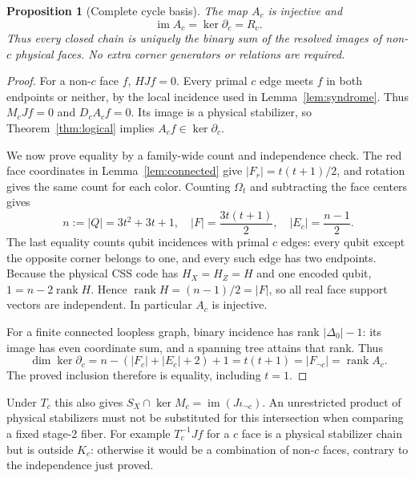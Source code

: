 \documentclass[11pt]{article}
\theoremstyle{definition}
\theoremstyle{plain}
\newtheorem{proposition}[definition]{Proposition}
\theoremstyle{remark}
\begin{document}
\begin{proposition}[Complete cycle basis]\label{prop:facebasis}
The map $A_c$ is injective and
\begin{equation}
 \operatorname{im}A_c=\ker\partial_c=R_c .
 \label{eq:facebasis}
\end{equation}
Thus every closed chain is uniquely the binary sum of the resolved
images of non-$c$ physical faces. No extra corner generators or
relations are required.
\end{proposition}
\begin{proof}
For a non-$c$ face $f$, $HJf=0$. Every primal $c$ edge meets $f$
in both endpoints or neither, by the local incidence used in
Lemma~\ref{lem:syndrome}. Thus $M_cJf=0$ and $D_cA_cf=0$.
Its image is a physical stabilizer, so Theorem~\ref{thm:logical}
implies $A_cf\in\ker\partial_c$.

We now prove equality by a family-wide count and independence check.
The red face coordinates in Lemma~\ref{lem:connected} give
$|F_r|=t(t+1)/2$, and rotation gives the same count for each color.
Counting $\Omega_t$ and subtracting the face centers gives
\[
 n:=|Q|=3t^2+3t+1,\quad
 |F|=\frac{3t(t+1)}2,\quad
 |E_c|=\frac{n-1}{2}.
\]
The last equality counts qubit incidences with primal $c$ edges:
every qubit except the opposite corner belongs to one, and every
such edge has two endpoints.
Because the physical CSS code has $H_X=H_Z=H$ and one encoded qubit,
$1=n-2\operatorname{rank}H$. Hence
$\operatorname{rank}H=(n-1)/2=|F|$, so all real face support vectors
are independent. In particular $A_c$ is injective.

For a finite connected loopless graph, binary incidence has rank
$|\Delta_0|-1$: its image has even coordinate sum, and a spanning
tree attains that rank. Thus
\[
 \dim\ker\partial_c
 =n-(|F_c|+|E_c|+2)+1
 =t(t+1)
 =|F_{\neg c}|=\operatorname{rank}A_c.
\]
The proved inclusion therefore is equality, including $t=1$.
\end{proof}

Under $T_c$ this also gives
$S_X\cap\ker M_c=\operatorname{im}(J\iota_{\neg c})$.
An unrestricted product of physical stabilizers must not be substituted
for this intersection when comparing a fixed stage-2 fiber.
For example $T_c^{-1}Jf$ for a $c$ face is a physical stabilizer chain
but is outside $K_c$: otherwise it would be a combination of non-$c$
faces, contrary to the independence just proved.
\end{document}
